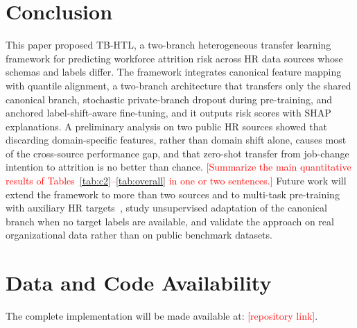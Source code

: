\documentclass[runningheads]{llncs}
\newcommand{\tbd}[1]{\textcolor{red}{#1}}
\begin{document}
\section{Conclusion}\label{sec:concl}
This paper proposed TB-HTL, a two-branch heterogeneous transfer learning framework for predicting workforce attrition risk across HR data sources whose schemas and labels differ. The framework integrates canonical feature mapping with quantile alignment, a two-branch architecture that transfers only the shared canonical branch, stochastic private-branch dropout during pre-training, and anchored label-shift-aware fine-tuning, and it outputs risk scores with SHAP explanations. A preliminary analysis on two public HR sources showed that discarding domain-specific features, rather than domain shift alone, causes most of the cross-source performance gap, and that zero-shot transfer from job-change intention to attrition is no better than chance. \tbd{[Summarize the main quantitative results of Tables~\ref{tab:c2}--\ref{tab:overall} in one or two sentences.]} Future work will extend the framework to more than two sources and to multi-task pre-training with auxiliary HR targets~\cite{caruana1997}, study unsupervised adaptation of the canonical branch when no target labels are available, and validate the approach on real organizational data rather than on public benchmark datasets.

\section*{Data and Code Availability}
The complete implementation will be made available at: \tbd{[repository link]}.
\end{document}
